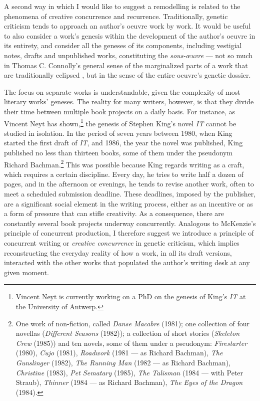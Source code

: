 \begin{paper}
A second way in which I would like to suggest a remodelling is related
to the phenomena of creative concurrence and recurrence. Traditionally,
genetic criticism tends to approach an author's oeuvre work by work. It
would be useful to also consider a work's genesis within the development
of the author's oeuvre in its entirety, and consider all the geneses of
its components, including vestigial notes, drafts and unpublished works,
constituting the \emph{sous-œuvre} --- not so much in Thomas C.
Connolly's general sense of the marginalized parts of a work that are
traditionally eclipsed \citep{connolly_paul_2018}, but in the sense of the entire
oeuvre's genetic dossier.

The focus on separate works is understandable, given the complexity of
most literary works' geneses. The reality for many writers, however, is
that they divide their time between multiple book projects on a daily
basis. For instance, as Vincent Neyt has shown,\footnote{Vincent Neyt is currently working on a PhD on the genesis of King’s \textit{IT} at the University of Antwerp.} the genesis of Stephen
King's novel \emph{IT} cannot be studied in isolation. In the period of
seven years between 1980, when King started the first draft of
\emph{IT}, and 1986, the year the novel was published, King published no
less than thirteen books, some of them under the pseudonym Richard
Bachman.\footnote{One work of non-fiction, called \emph{Danse Macabre}
  (1981); one collection of four novellas (\emph{Different Seasons}
  (1982)); a collection of short stories (\emph{Skeleton Crew} (1985))
  and ten novels, some of them under a pseudonym: \emph{Firestarter}
  (1980), \emph{Cujo} (1981), \emph{Roadwork} (1981 --- as Richard
  Bachman), \emph{The Gunslinger} (1982), \emph{The Running Man} (1982
  --- as Richard Bachman), \emph{Christine} (1983), \emph{Pet Sematary}
  (1985), \emph{The Talisman} (1984 --- with Peter Straub),
  \emph{Thinner} (1984 --- as Richard Bachman), \emph{The Eyes of the
  Dragon} (1984).} This was possible because King regards writing as a
craft, which requires a certain discipline. Every day, he tries to write
half a dozen of pages, and in the afternoon or evenings, he tends to
revise another work, often to meet a scheduled submission deadline.
These deadlines, imposed by the publisher, are a significant social
element in the writing process, either as an incentive or as a form of
pressure that can stifle creativity. As a consequence, there are
constantly several book projects underway concurrently. Analogous to
McKenzie's principle of concurrent production, I therefore suggest we
introduce a principle of concurrent writing or \emph{creative
concurrence} in genetic criticism, which implies reconstructing the
everyday reality of how a work, in all its draft versions, interacted
with the other works that populated the author's writing desk at any
given moment.


\end{paper}
